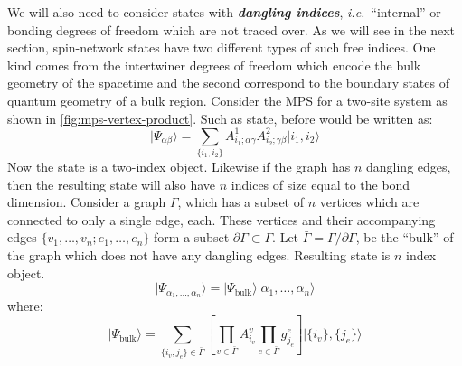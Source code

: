 \documentclass[preprint]{SciPost}
\newcommand{\ie}{\textit{i.e.}~}
\newcommand{\mc}[1]{\mathcal{#1}}
\newcommand{\ket}[1]{\vert #1 \rangle}
\theoremstyle{plain} %
\begin{document}
We will also need to consider states with \emph{\textbf{dangling indices}}, \ie ``internal'' or bonding degrees of freedom which are not traced over. As we will see in the next section, spin-network states have two different types of such free indices. One kind comes from the intertwiner degrees of freedom which encode the bulk geometry of the spacetime and the second correspond to the boundary states of quantum geometry of a bulk region. Consider the MPS for a two-site system as shown in \autoref{fig:mps-vertex-product}. Such as state, before would be written as:
\begin{equation}\label{eqn:two-index-mps}
\ket{\Psi_{\alpha\beta}}= \sum_{\{i_1, i_2\}} A^1_{i_1;\alpha\gamma} A^2_{i_2;\gamma\beta} \ket{i_1, i_2}
\end{equation}
Now the state is a two-index object. Likewise if the graph has $ n $ dangling edges, then the resulting state will also have $ n $ indices of size equal to the bond dimension. Consider a graph $ \Gamma $, which has a subset of $ n $ vertices which are connected to only a single edge, each. These vertices and their accompanying edges $ \{ v_1,\ldots,v_n; e_1, \ldots, e_n \} $ form a subset $ \partial \Gamma \subset \Gamma $. Let $ \bar{\Gamma} = \Gamma/\partial \Gamma$, be the ``bulk'' of the graph which does not have any dangling edges. Resulting state is $ n $ index object.
\begin{equation}\label{eqn:n-index-mps}
\ket{\Psi_{\alpha_1,\ldots,\alpha_n}} = \ket{\Psi_\text{bulk}}\ket{\alpha_1,\ldots,\alpha_n}
\end{equation}
where:
\begin{equation}\label{eqn:bulk-mps}
\ket{\Psi_\text{bulk}} = \underset{\{i_v,j_e\} \in \bar{\Gamma}}{\sum} \left[ \underset{v \in \bar\Gamma}\prod A^v_{i_v} \underset{e \in \bar\Gamma}\prod g^e_{j_e} \right] \ket{ \{ i_v \}, \{ j_e \} }
\end{equation}



\end{document}
